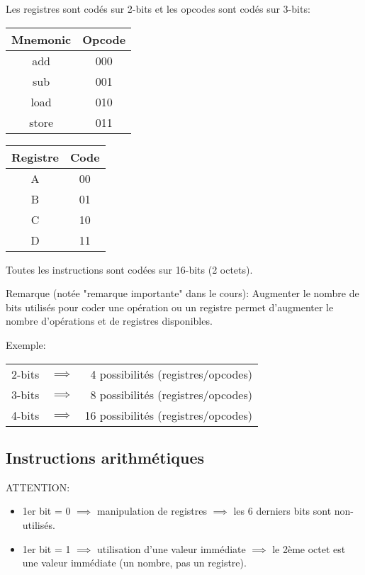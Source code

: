 \documentclass[a4paper]{article}
\begin{document}
Les registres sont codés sur 2-bits et les opcodes sont codés sur 3-bits:
\begin{center}
\begin{tabular}{|c|c|} \hline
    Mnemonic & Opcode \\ \hline
    add & 000 \\
    sub & 001 \\
    load & 010 \\
    store & 011 \\ \hline
\end{tabular}
\hspace{2cm}
\begin{tabular}{|c|c|} \hline
    Registre & Code \\ \hline
    A & 00 \\
    B & 01 \\
    C & 10 \\
    D & 11 \\ \hline
\end{tabular}
\end{center}

Toutes les instructions sont codées sur 16-bits (2 octets).

Remarque (notée "remarque importante" dans le cours): Augmenter le nombre de bits utilisés pour coder une opération ou un registre permet d’augmenter le nombre d’opérations et de registres disponibles.
\begin{example}
    Exemple:
    \begin{center}
    \begin{tabular}{lcr}
        2-bits & $ \implies $ &  4 possibilités (registres/opcodes) \\
        3-bits & $ \implies $ &  8 possibilités (registres/opcodes) \\
        4-bits & $ \implies $ & 16 possibilités (registres/opcodes) \\
    \end{tabular}
    \end{center}
\end{example}





\subsection{Instructions arithmétiques}

ATTENTION:
\begin{itemize}
    \item 1er bit = 0 $ \implies $ manipulation de registres $ \implies $ les 6 derniers bits sont non-utilisés.
    \item 1er bit = 1 $ \implies $ utilisation d'une valeur immédiate $ \implies $ le 2ème octet est une valeur immédiate (un nombre, pas un registre).
\end{itemize}
\end{document}
